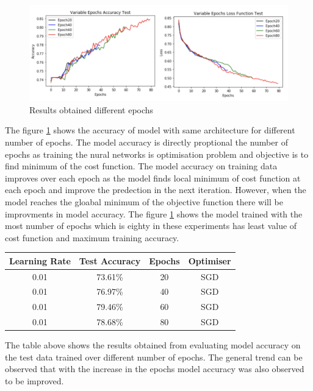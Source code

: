 \begin{figure}[!htp]
    \includegraphics[width=\textwidth]{Images/epochs.png}
    \caption{Results obtained different epochs}
    \label{fig:epochsTest}
\end{figure}

The figure \ref{fig:epochsTest} shows the accuracy of model with same architecture for 
different number of epochs. The model accuracy is directly proptional the number of epochs as 
training the nural networks is optimisation problem and objective is to find minimum of the cost 
function. The model accuracy on training data improves over each epoch as the model finds 
local minimum of cost function at each epoch and improve the predection in the next iteration.
However, when the model reaches the gloabal minimum of the objective function there will 
be improvments in model accuracy. The figure \ref{fig:epochsTest} shows the model trained 
with the most number of epochs which is eighty in these experiments has least value of 
cost function and maximum training accuracy.

\begin{center}
    \begin{tabular} { | c | c | c | c |}
        \hline
        Learning Rate & Test Accuracy & Epochs  & Optimiser\\ 
        \hline
        0.01 & 73.61\% & 20 & SGD \\ 
        \hline 
        0.01 & 76.97\% & 40 & SGD  \\
        \hline 
        0.01 & 79.46\% & 60 & SGD \\
        \hline
        0.01 & 78.68\% & 80 & SGD \\
        \hline
    \end{tabular}
\end{center}

The table above shows the results obtained from evaluating model accuracy on the test data trained 
over different number of epochs. The general trend can be observed that with the increase in the epochs 
model accuracy was also observed to be improved. 